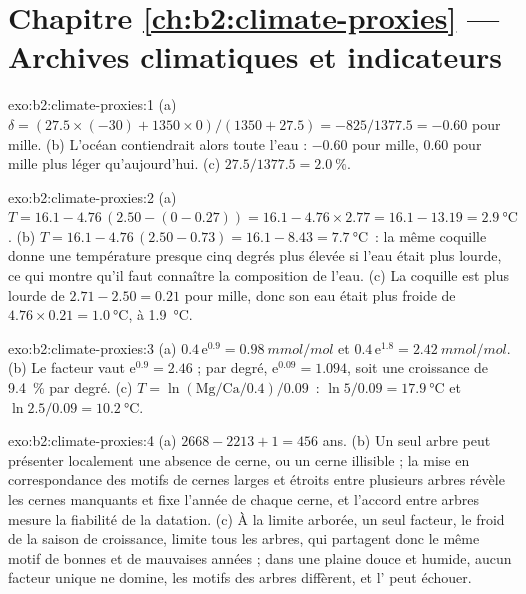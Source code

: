 \section*{Chapitre \ref{ch:b2:climate-proxies} --- Archives climatiques et indicateurs}

\begin{solution}{exo:b2:climate-proxies:1}
(a) $\delta = (27.5 \times (-30) + 1350 \times 0)/(1350 + 27.5) = -825/1377.5 = -0.60$ pour mille.
(b) L'océan contiendrait alors toute l'eau : $-0.60$ pour mille, \num{0.60} pour mille plus léger
qu'aujourd'hui. (c) $27.5/1377.5 = \qty{2.0}{\percent}$.
\end{solution}

\begin{solution}{exo:b2:climate-proxies:2}
(a) $T = 16.1 - 4.76\,(2.50 - (0 - 0.27)) = 16.1 - 4.76 \times 2.77 = 16.1 - 13.19 =
\qty{2.9}{\celsius}$. (b) $T = 16.1 - 4.76\,(2.50 - 0.73) = 16.1 - 8.43 = \qty{7.7}{\celsius}$~: la même
coquille donne une température presque cinq degrés plus élevée si l'eau était plus lourde, ce qui montre
qu'il faut connaître la composition de l'eau. (c) La coquille est plus lourde de $2.71 - 2.50 = 0.21$ pour mille,
donc son eau était plus froide de $4.76 \times 0.21 = \qty{1.0}{\celsius}$, à \qty{1.9}{\celsius}.
\end{solution}

\begin{solution}{exo:b2:climate-proxies:3}
(a) $0.4\,\mathrm{e}^{0.9} = \qty{0.98}{mmol/mol}$ et $0.4\,\mathrm{e}^{1.8} =
\qty{2.42}{mmol/mol}$. (b) Le facteur vaut $\mathrm{e}^{0.9} = 2.46$ ; par degré, $\mathrm{e}^{0.09}
= 1.094$, soit une croissance de \qty{9.4}{\percent} par degré. (c) $T = \ln(\text{Mg/Ca}/0.4)/0.09$~:
$\ln 5/0.09 = \qty{17.9}{\celsius}$ et $\ln 2.5/0.09 = \qty{10.2}{\celsius}$.
\end{solution}

\begin{solution}{exo:b2:climate-proxies:4}
(a) $2668 - 2213 + 1 = 456$ ans. (b) Un seul arbre peut présenter localement une absence de cerne, ou un cerne
illisible ; la mise en correspondance des motifs de cernes larges et étroits entre plusieurs arbres révèle les cernes
manquants et fixe l'année de chaque cerne, et l'accord entre arbres mesure la
fiabilité de la datation. (c) À la limite arborée, un seul facteur, le froid de la saison de croissance,
limite tous les arbres, qui partagent donc le même motif de bonnes et de mauvaises années ; dans une
plaine douce et humide, aucun facteur unique ne domine, les motifs des arbres diffèrent, et l' peut échouer.
\end{solution}

